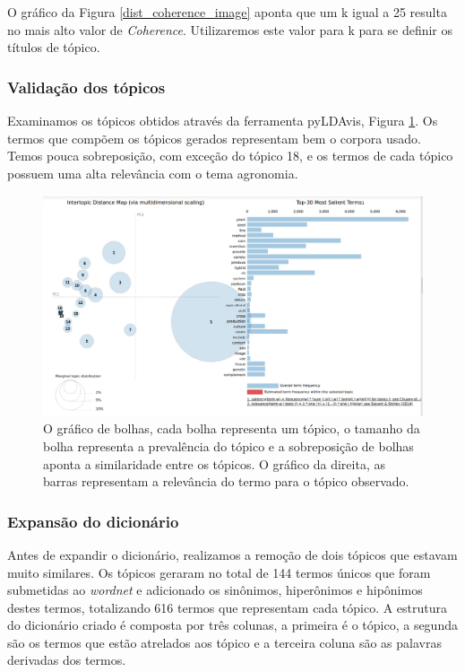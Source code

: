 O gráfico da Figura \ref{dist_coherence_image} aponta que um k igual a 25 resulta no mais alto valor de \textit{Coherence}. Utilizaremos este valor para k para se definir os títulos de tópico.

\subsubsection{Validação dos tópicos}

Examinamos os tópicos obtidos através da ferramenta pyLDAvis, Figura \ref{pyLDAvis_image}. Os termos que compõem os tópicos gerados  representam bem o corpora usado. Temos pouca sobreposição, com exceção do tópico 18, e os termos de cada tópico possuem uma alta relevância com o tema agronomia.  

\begin{figure}[ht!]
	\centering
	\includegraphics[scale=0.4]{imagens/construcao_dicionario.png}
	\caption{O gráfico de bolhas, cada bolha representa um tópico, o tamanho da bolha representa a prevalência do tópico e a sobreposição de bolhas aponta a similaridade entre os tópicos. O gráfico da direita, as barras representam a relevância do termo para o tópico observado.
			 \label{pyLDAvis_image}}
\end{figure}

\subsubsection{Expansão do dicionário}

Antes de expandir o dicionário, realizamos a remoção de dois tópicos que estavam muito similares. Os tópicos geraram no total de 144 termos únicos que foram submetidas ao \textit{wordnet} e adicionado os sinônimos, hiperônimos e hipônimos destes termos, totalizando 616 termos que representam cada tópico. A estrutura do dicionário criado é composta por três colunas, a primeira é o tópico, a segunda são os termos que estão atrelados aos tópico e a terceira coluna são as palavras derivadas dos termos.

